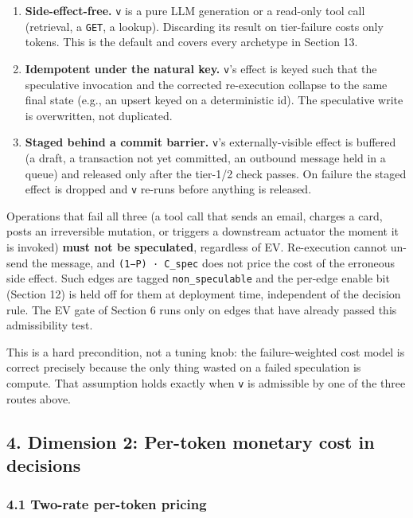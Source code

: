 \documentclass[
  11pt,
]{article}
\providecommand{\tightlist}{%
  \setlength{\itemsep}{0pt}\setlength{\parskip}{0pt}}
\begin{document}
\begin{enumerate}
\def\labelenumi{\arabic{enumi}.}
\tightlist
\item
  \textbf{Side-effect-free.} \texttt{v} is a pure LLM generation or a
  read-only tool call (retrieval, a \texttt{GET}, a lookup). Discarding
  its result on tier-failure costs only tokens. This is the default and
  covers every archetype in Section 13.
\item
  \textbf{Idempotent under the natural key.} \texttt{v}'s effect is
  keyed such that the speculative invocation and the corrected
  re-execution collapse to the same final state (e.g., an upsert keyed
  on a deterministic id). The speculative write is overwritten, not
  duplicated.
\item
  \textbf{Staged behind a commit barrier.} \texttt{v}'s
  externally-visible effect is buffered (a draft, a transaction not yet
  committed, an outbound message held in a queue) and released only
  after the tier-1/2 check passes. On failure the staged effect is
  dropped and \texttt{v} re-runs before anything is released.
\end{enumerate}

Operations that fail all three (a tool call that sends an email, charges
a card, posts an irreversible mutation, or triggers a downstream
actuator the moment it is invoked) \textbf{must not be speculated},
regardless of EV. Re-execution cannot un-send the message, and
\texttt{(1−P)\ ·\ C\_spec} does not price the cost of the erroneous side
effect. Such edges are tagged \texttt{non\_speculable} and the per-edge
enable bit (Section 12) is held off for them at deployment time,
independent of the decision rule. The EV gate of Section 6 runs only on
edges that have already passed this admissibility test.

This is a hard precondition, not a tuning knob: the failure-weighted
cost model is correct precisely because the only thing wasted on a
failed speculation is compute. That assumption holds exactly when
\texttt{v} is admissible by one of the three routes above.

\subsection{4. Dimension 2: Per-token monetary cost in
decisions}\label{dimension-2-per-token-monetary-cost-in-decisions}

\subsubsection{4.1 Two-rate per-token
pricing}\label{two-rate-per-token-pricing}
\end{document}
